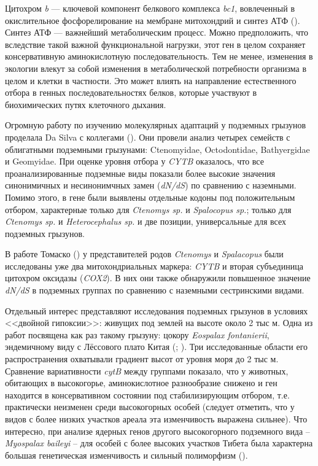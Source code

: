 Цитохром \textit{b} --- ключевой компонент белкового комплекса \textit{bc1}, вовлеченный в окислительное фосфорелирование на мембране митохондрий и синтез АТФ (\cite{Tomasco2014}). Синтез АТФ --- важнейший метаболическим процесс. Можно предположить, что вследствие такой важной функциональной нагрузки, этот ген в целом сохраняет консервативную аминокислотную последовательность. Тем не менее, изменения в экологии влекут за собой изменения в метаболической потребности организма в целом и клетки в частности. Это может влиять на направление естественного отбора в генных последовательностях белков, которые участвуют в биохимических путях клеточного дыхания.

Огромную работу по изучению молекулярных адаптаций у подземных грызунов проделала Da Silva с коллегами (\cite{DaSilva2009}). Они провели анализ четырех семейств с облигатными подземными грызунами: Ctenomyidae, Octodontidae, Bathyergidae и Geomyidae. При оценке уровня отбора у \textit{CYTB} оказалось, что все проанализированные подземные виды показали более высокие значения синонимичных и несинонимчных замен (\textit{dN/dS}) по сравнению с наземными. Помимо этого, в гене были выявлены отдельные кодоны под положительным отбором, характерные только для \textit{Ctenomys sp.} и \textit{Spalocopus sp.}; только для \textit{Ctenomys sp.} и \textit{Heterocephalus sp.} и две позиции, универсальные для всех подземных грызунов.

В работе Томаско (\cite{Tomasco2014}) у представителей родов \textit{Ctenomys} и \textit{Spalacopus} были исследованы уже два митохондриальных маркера: \textit{CYTB} и вторая субъединица цитохром оксидазы (\textit{COX2}). В них они также обнаружили повышенное значение \textit{dN/dS} в подземных группах по сравнению с наземными сестринскими видами.

Отдельный интерес представляют исследования подземных грызунов в условиях <<двойной гипоксии>>: живущих под землей на высоте около 2 тыс м. Одна из работ посвящена как раз такому грызуну: цокору \textit{Eospalax fontanierii}, эндемичному виду с Лёссового плато Китая (\cite{Zhang2013a}; \cite{Li1989}). Три исследованные области его распространения охватывали градиент высот от уровня моря до 2 тыс м. Сравнение вариативности \textit{cytB} между группами показало, что у животных, обитающих в высокогорье, аминокислотное разнообразие снижено и ген находится в консервативном состоянии под стабилизирующим отбором, т.е. практически неизменен среди высокогорных особей (следует отметить, что у видов с более низких участков ареала эта изменчивость выражена сильнее). Что интересно, при анализе ядерных генов другого высокогорного подземного вида -- \textit{Myospalax baileyi} -- для особей с более высоких участков Тибета была характерна большая генетическая изменчивость и сильный полиморфизм (\cite{Cai2018}).

